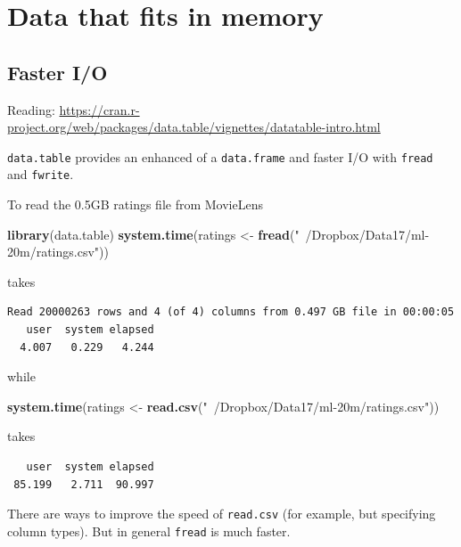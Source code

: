 \documentclass[]{book}
\newenvironment{Shaded}{\begin{snugshade}}{\end{snugshade}}
\newcommand{\KeywordTok}[1]{\textcolor[rgb]{0.13,0.29,0.53}{\textbf{#1}}}
\newcommand{\StringTok}[1]{\textcolor[rgb]{0.31,0.60,0.02}{#1}}
\newcommand{\NormalTok}[1]{#1}
\theoremstyle{definition}
\theoremstyle{definition}
\theoremstyle{definition}
\theoremstyle{remark}
\begin{document}
\section{Data that fits in memory}\label{data-that-fits-in-memory}

\subsection{Faster I/O}\label{faster-io}

Reading:
\url{https://cran.r-project.org/web/packages/data.table/vignettes/datatable-intro.html}

\texttt{data.table} provides an enhanced of a \texttt{data.frame} and
faster I/O with \texttt{fread} and \texttt{fwrite}.

To read the 0.5GB ratings file from MovieLens

\begin{Shaded}
\begin{Highlighting}[]
\KeywordTok{library}\NormalTok{(data.table)}
\KeywordTok{system.time}\NormalTok{(ratings <-}\StringTok{ }\KeywordTok{fread}\NormalTok{(}\StringTok{"~/Dropbox/Data17/ml-20m/ratings.csv"}\NormalTok{))}
\end{Highlighting}
\end{Shaded}

takes

\begin{verbatim}
Read 20000263 rows and 4 (of 4) columns from 0.497 GB file in 00:00:05
   user  system elapsed 
  4.007   0.229   4.244
\end{verbatim}

while

\begin{Shaded}
\begin{Highlighting}[]
\KeywordTok{system.time}\NormalTok{(ratings <-}\StringTok{ }\KeywordTok{read.csv}\NormalTok{(}\StringTok{"~/Dropbox/Data17/ml-20m/ratings.csv"}\NormalTok{))}
\end{Highlighting}
\end{Shaded}

takes

\begin{verbatim}
   user  system elapsed 
 85.199   2.711  90.997 
\end{verbatim}

There are ways to improve the speed of \texttt{read.csv} (for example,
but specifying column types). But in general \texttt{fread} is much
faster.
\end{document}
